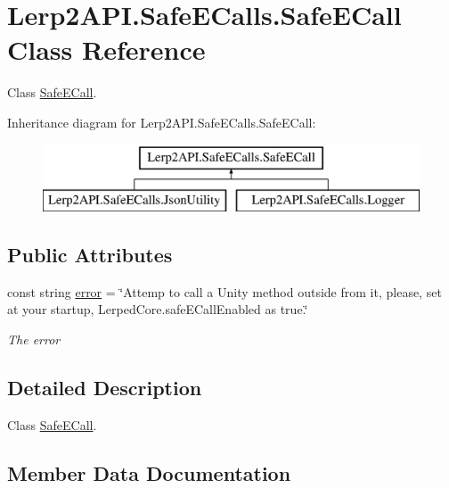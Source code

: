 \hypertarget{class_lerp2_a_p_i_1_1_safe_e_calls_1_1_safe_e_call}{}\section{Lerp2\+A\+P\+I.\+Safe\+E\+Calls.\+Safe\+E\+Call Class Reference}
\label{class_lerp2_a_p_i_1_1_safe_e_calls_1_1_safe_e_call}


Class \hyperlink{class_lerp2_a_p_i_1_1_safe_e_calls_1_1_safe_e_call}{Safe\+E\+Call}.  


Inheritance diagram for Lerp2\+A\+P\+I.\+Safe\+E\+Calls.\+Safe\+E\+Call\+:\begin{figure}[H]
\begin{center}
\leavevmode
\includegraphics[height=2.000000cm]{class_lerp2_a_p_i_1_1_safe_e_calls_1_1_safe_e_call}
\end{center}
\end{figure}
\subsection*{Public Attributes}
\begin{DoxyCompactItemize}
\item 
const string \hyperlink{class_lerp2_a_p_i_1_1_safe_e_calls_1_1_safe_e_call_a3b3027c61058c00eb2ab7a7f8de482fe}{error} = \char`\"{}Attemp to call a Unity method outside from it, please, set at your startup, \textquotesingle{}Lerped\+Core.\+safe\+E\+Call\+Enabled\textquotesingle{} as true.\char`\"{}
\begin{DoxyCompactList}\small\item\em The error \end{DoxyCompactList}\end{DoxyCompactItemize}


\subsection{Detailed Description}
Class \hyperlink{class_lerp2_a_p_i_1_1_safe_e_calls_1_1_safe_e_call}{Safe\+E\+Call}. 



\subsection{Member Data Documentation}
\mbox{\label{class_lerp2_a_p_i_1_1_safe_e_calls_1_1_safe_e_call_a3b3027c61058c00eb2ab7a7f8de482fe}} 
